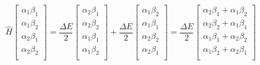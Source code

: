 \documentclass{article}
\begin{document}
$$ \hat{H} \begin{bmatrix}
    \alpha_1 \beta_1 \\
    \alpha_1 \beta_2 \\
    \alpha_2 \beta_1 \\ 
    \alpha_2 \beta_2 \\
\end{bmatrix} = \frac{\Delta E}{2} \begin{bmatrix}
    \alpha_2 \beta_1 \\
    \alpha_2 \beta_2 \\
    \alpha_1 \beta_1 \\ 
    \alpha_1 \beta_2 \\
\end{bmatrix} + \frac{\Delta E}{2} \begin{bmatrix}
    \alpha_1 \beta_2 \\
    \alpha_1 \beta_1 \\
    \alpha_2 \beta_2 \\ 
    \alpha_2 \beta_1 \\
\end{bmatrix}  = \frac{\Delta E}{2} \begin{bmatrix}
    \alpha_2 \beta_1 + \alpha_1 \beta_2 \\
    \alpha_2 \beta_2 + \alpha_1 \beta_1 \\
    \alpha_1 \beta_1 + \alpha_2 \beta_2 \\ 
    \alpha_1 \beta_2 + \alpha_2 \beta_1 \\
\end{bmatrix}$$
\end{document}
